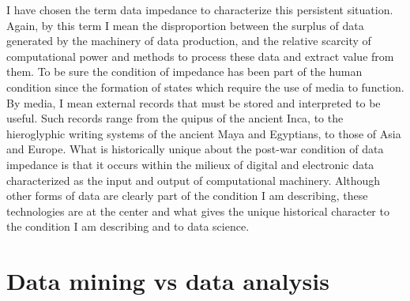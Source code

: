 \documentclass[
  letterpaper,
]{report}
\begin{document}
I have chosen the term data impedance to characterize this persistent
situation. Again, by this term I mean the disproportion between the
surplus of data generated by the machinery of data production, and the
relative scarcity of computational power and methods to process these
data and extract value from them. To be sure the condition of impedance
has been part of the human condition since the formation of states which
require the use of media to function. By media, I mean external records
that must be stored and interpreted to be useful. Such records range
from the quipus of the ancient Inca, to the hieroglyphic writing systems
of the ancient Maya and Egyptians, to those of Asia and Europe. What is
historically unique about the post-war condition of data impedance is
that it occurs within the milieux of digital and electronic data
characterized as the input and output of computational machinery.
Although other forms of data are clearly part of the condition I am
describing, these technologies are at the center and what gives the
unique historical character to the condition I am describing and to data
science.

\hypertarget{data-mining-vs-data-analysis}{%
\section{Data mining vs data
analysis}\label{data-mining-vs-data-analysis}}
\end{document}
